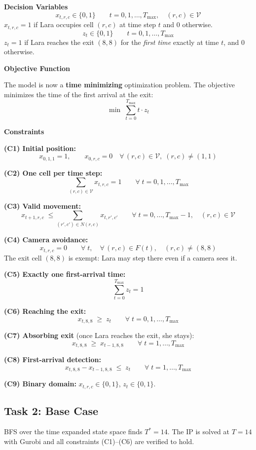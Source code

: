 \documentclass[12pt,a4paper]{article}
\begin{document}
\textbf{Decision Variables}
\[
  x_{t,r,c} \in \{0,1\} \qquad t=0,1,\ldots,T_{\max},\quad (r,c)\in\mathcal{V}
\]
$x_{t,r,c}=1$ if Lara occupies cell $(r,c)$ at time step $t$ and $0$ otherwise.
\[
  z_t \in \{0,1\} \qquad t=0,1,\ldots,T_{\max}
\]
$z_t=1$ if Lara reaches the exit $(8,8)$ for the \emph{first time} exactly at time $t$,
and $0$ otherwise.

\textbf{Objective Function}

The model is now a \textbf{time minimizing} optimization problem. The objective minimizes
the time of the first arrival at the exit:
\[
  \min\;\sum_{t=0}^{T_{\max}} t\cdot z_t
\]

\textbf{Constraints}

\textbf{(C1) Initial position:}
\[
  x_{0,1,1}=1, \qquad x_{0,r,c}=0 \quad \forall\,(r,c)\in\mathcal{V},\;(r,c)\neq(1,1)
\]

\textbf{(C2) One cell per time step:}
\[
  \sum_{(r,c)\in\mathcal{V}} x_{t,r,c}=1 \qquad \forall\;t=0,1,\ldots,T_{\max}
\]

\textbf{(C3) Valid movement:}
\[
  x_{t+1,r,c}\;\leq\!\!\sum_{(r',c')\in N(r,c)}\!\! x_{t,r',c'}
  \qquad \forall\;t=0,\ldots,T_{\max}-1,\quad(r,c)\in\mathcal{V}
\]

\textbf{(C4) Camera avoidance:}
\[
  x_{t,r,c}=0 \qquad \forall\;t,\quad\forall\,(r,c)\in F(t),\quad(r,c)\neq(8,8)
\]
The exit cell $(8,8)$ is exempt: Lara may step there even if a camera sees it.

\textbf{(C5) Exactly one first-arrival time:}
\[
  \sum_{t=0}^{T_{\max}} z_t = 1
\]

\textbf{(C6) Reaching the exit:}
\[
  x_{t,8,8}\;\geq\;z_t \qquad \forall\;t=0,1,\ldots,T_{\max}
\]

\textbf{(C7) Absorbing exit} (once Lara reaches the exit, she stays):
\[
  x_{t,8,8}\;\geq\;x_{t-1,8,8} \qquad \forall\;t=1,\ldots,T_{\max}
\]

\textbf{(C8) First-arrival detection:}
\[
  x_{t,8,8}-x_{t-1,8,8}\;\leq\;z_t \qquad \forall\;t=1,\ldots,T_{\max}
\]

\textbf{(C9) Binary domain:} $x_{t,r,c}\in\{0,1\}$, $z_t\in\{0,1\}$.

\subsection*{Task 2: Base Case}

BFS over the time expanded state space finds $T^*=14$. The IP is solved at $T=14$ with
Gurobi and all constraints (C1)--(C6) are verified to hold.
\end{document}
